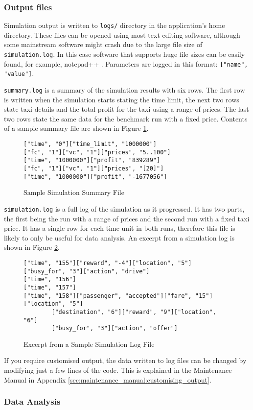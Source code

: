 \subsubsection{Output files}
\label{sec:user_manual:using:output}

Simulation output is written to \texttt{logs/} directory in the application's
home directory. These files can be opened using most text editing software,
although some mainstream software might crash due to the large file size of
\texttt{simulation.log}. In this case software that supports huge file sizes
can be easily found, for example, notepad++ \parencite{Notepad++}. Parameters are logged in this format: \texttt{["name", "value"]}.

\texttt{summary.log} is a summary of the simulation results with six rows. The
first row is written when the simulation starts stating the time limit, the
next two rows state taxi details and the total profit for the taxi using a
range of prices. The last two rows state the same data for the benchmark run
with a fixed price. Contents of a sample summary file are shown in Figure
\ref{figure:output:summary}.

\begin{figure}
  \begin{verbatim}
["time", "0"]["time_limit", "1000000"]
["fc", "1"]["vc", "1"]["prices", "5..100"]
["time", "1000000"]["profit", "839289"]
["fc", "1"]["vc", "1"]["prices", "[20]"]
["time", "1000000"]["profit", "-1677056"]
  \end{verbatim}
\caption{
  Sample Simulation Summary File
  \label{figure:output:summary}
}
\end{figure}

\texttt{simulation.log} is a full log of the simulation as it progressed. It
has two parts, the first being the run with a range of prices and the second
run with a fixed taxi price. It has a single row for each time unit in both
runs, therefore this file is likely to only be useful for data analysis. An
excerpt from a simulation log is shown in Figure \ref{figure:output:log}.

\begin{figure}
  \begin{verbatim}
["time", "155"]["reward", "-4"]["location", "5"]["busy_for", "3"]["action", "drive"]
["time", "156"]
["time", "157"]
["time", "158"]["passenger", "accepted"]["fare", "15"]["location", "5"]
        ["destination", "6"]["reward", "9"]["location", "6"]
        ["busy_for", "3"]["action", "offer"]
  \end{verbatim}
\caption{
  Excerpt from a Sample Simulation Log File
  \label{figure:output:log}
}
\end{figure}

If you require customised output, the data written to log files can be changed
by modifying just a few lines of the code. This is explained in the Maintenance
Manual in Appendix \ref{sec:maintenance_manual:customising_output}.


\subsubsection{Data Analysis}
\label{sec:user_manual:using:output}
